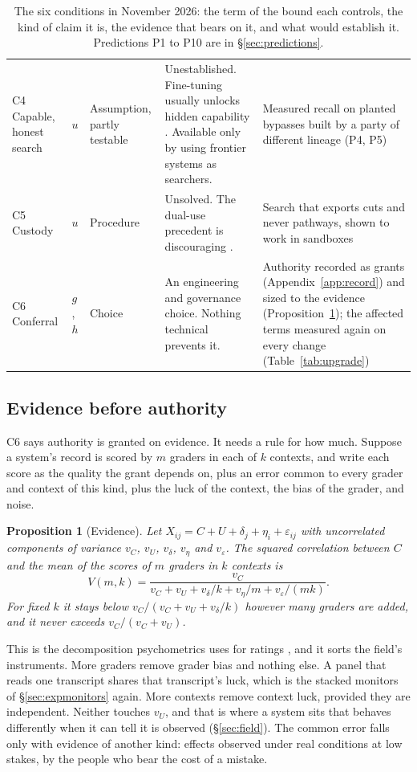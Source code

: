 \documentclass[10pt,twocolumn,letterpaper]{article}
\newtheorem{proposition}{Proposition}
\theoremstyle{definition}
\begin{document}
\begin{table}[t]
\begin{tabularx}{\textwidth}{@{}P{0.82in}P{0.42in}P{0.78in}LL@{}}
C4 Capable, honest search & $u$ & Assumption, partly testable & Unestablished. Fine-tuning usually unlocks hidden capability \cite{password}. Available only by using frontier systems as searchers. & Measured recall on planted bypasses built by a party of different lineage (P4, P5)\\
C5 Custody & $u$ & Procedure & Unsolved. The dual-use precedent is discouraging \cite{urbina,lewis}. & Search that exports cuts and never pathways, shown to work in sandboxes\\
C6 Conferral & $g$, $h$ & Choice & An engineering and governance choice. Nothing technical prevents it. & Authority recorded as grants (Appendix~\ref{app:record}) and sized to the evidence (Proposition~\ref{prop:evidence}); the affected terms measured again on every change (Table~\ref{tab:upgrade})\\
\bottomrule
\end{tabularx}
\caption{The six conditions in November 2026: the term of the bound each controls, the kind of claim it is, the evidence that bears on it, and what would establish it. Predictions P1 to P10 are in \S\ref{sec:predictions}.}
\label{tab:status}
\end{table}

\subsection{Evidence before authority}
\label{sec:evidence}

C6 says authority is granted on evidence. It needs a rule for how much. Suppose a system's record is scored by $m$ graders in each of $k$ contexts, and write each score as the quality the grant depends on, plus an error common to every grader and context of this kind, plus the luck of the context, the bias of the grader, and noise.

\begin{proposition}[Evidence]
\label{prop:evidence}
Let $X_{ij}=C+U+\delta_{j}+\eta_{i}+\varepsilon_{ij}$ with uncorrelated components of variance $v_{C}$, $v_{U}$, $v_{\delta}$, $v_{\eta}$ and $v_{\varepsilon}$. The squared correlation between $C$ and the mean of the scores of $m$ graders in $k$ contexts is
\[
V(m,k)=\frac{v_{C}}{v_{C}+v_{U}+v_{\delta}/k+v_{\eta}/m+v_{\varepsilon}/(mk)}.
\]
For fixed $k$ it stays below $v_{C}/(v_{C}+v_{U}+v_{\delta}/k)$ however many graders are added, and it never exceeds $v_{C}/(v_{C}+v_{U})$.
\end{proposition}

This is the decomposition psychometrics uses for ratings \cite{cronbach,brennan}, and it sorts the field's instruments. More graders remove grader bias and nothing else. A panel that reads one transcript shares that transcript's luck, which is the stacked monitors of \S\ref{sec:expmonitors} again. More contexts remove context luck, provided they are independent. Neither touches $v_{U}$, and that is where a system sits that behaves differently when it can tell it is observed (\S\ref{sec:field}). The common error falls only with evidence of another kind: effects observed under real conditions at low stakes, by the people who bear the cost of a mistake.
\end{document}
